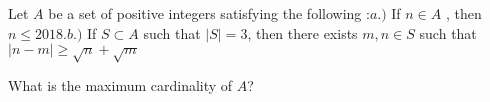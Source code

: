 Let $A$ be a set of positive integers satisfying the following :$a.)$ If $n \in A$ , then $n \le 2018$.$b.)$ If $S \subset A$ such that $|S|=3$,  then there exists $m,n \in S$ such that $|n-m| \ge \sqrt{n}+\sqrt{m}$

What is the maximum cardinality of $A$?
